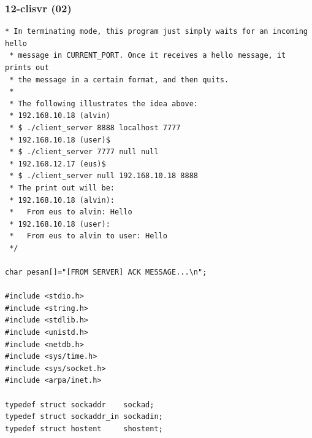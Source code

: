 \documentclass[xcolor=table, notheorems, hyperref={pdfpagelabels=false}]{beamer}
\begin{document}
\begin{frame}[fragile]
\frametitle{12-clisvr (02)}
\begin{lstlisting}[basicstyle=\ttfamily\tiny]
 * In terminating mode, this program just simply waits for an incoming hello
 * message in CURRENT_PORT. Once it receives a hello message, it prints out
 * the message in a certain format, and then quits.
 *
 * The following illustrates the idea above:
 * 192.168.10.18 (alvin)
 * $ ./client_server 8888 localhost 7777
 * 192.168.10.18 (user)$
 * $ ./client_server 7777 null null
 * 192.168.12.17 (eus)$
 * $ ./client_server null 192.168.10.18 8888
 * The print out will be:
 * 192.168.10.18 (alvin):
 *   From eus to alvin: Hello
 * 192.168.10.18 (user):
 *   From eus to alvin to user: Hello
 */

char pesan[]="[FROM SERVER] ACK MESSAGE...\n";

#include <stdio.h>
#include <string.h>
#include <stdlib.h>
#include <unistd.h>
#include <netdb.h>
#include <sys/time.h>
#include <sys/socket.h>
#include <arpa/inet.h>

typedef struct sockaddr    sockad;
typedef struct sockaddr_in sockadin;
typedef struct hostent     shostent;

\end{lstlisting}
\end{frame}
\end{document}
